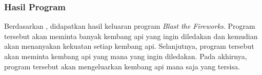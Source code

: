 \documentclass{subfiles}
\begin{document}
\subsubsection{\SourceCode}
\vspace{-0.5ex}
\begin{indentlevel0}
    
    
\end{indentlevel0}
\subsubsection{Hasil Program}
\begin{indentlevel0}
    \ilz{}Berdasarkan , didapatkan hasil keluaran program \textit{Blast the Fireworks}. Program tersebut akan meminta banyak kembang api yang ingin diledakan dan kemudian akan menanyakan kekuatan setiap kembang api. Selanjutnya, program tersebut akan meminta kembang api yang mana yang ingin diledakan. Pada akhirnya, program tersebut akan mengeluarkan kembang api mana saja yang tersisa.
\end{indentlevel0}
\end{document}

